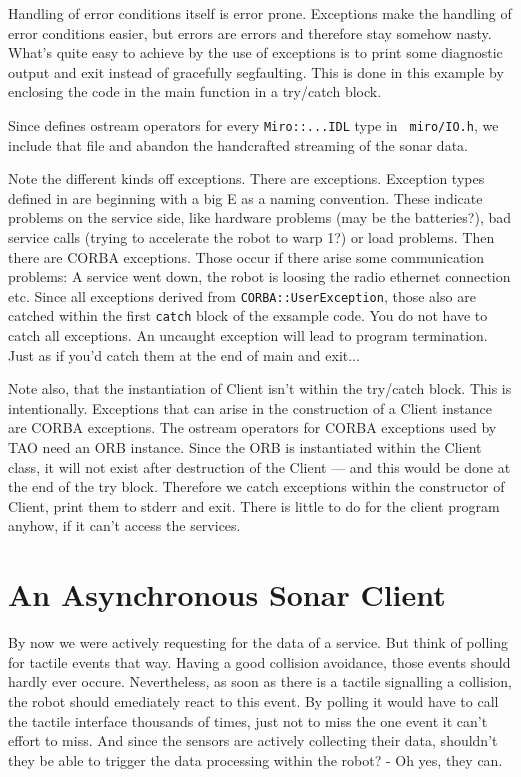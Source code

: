Handling of error conditions itself is error prone. Exceptions make
the handling of error conditions easier, but errors are errors and
therefore stay somehow nasty. What's quite easy to achieve by the use
of exceptions is to print some diagnostic output and exit instead of
gracefully segfaulting. This is done in this example by enclosing the
code in the main function in a try/catch block.

Since \miro defines ostream operators for every \lstinline!Miro::...IDL!
type in \lstinline! miro/IO.h!, we include that file and abandon the
handcrafted streaming of the sonar data.

Note the different kinds off exceptions. There are \miro exceptions.
Exception types defined in \miro are beginning with a big E as a
naming convention. These indicate problems on the service side, like
hardware problems (may be the batteries?), bad service calls (trying
to accelerate the robot to warp 1?) or load problems. Then there are
CORBA exceptions. Those occur if there arise some communication
problems: A service went down, the robot is loosing the radio ethernet
connection etc. Since all \miro
exceptions derived from \lstinline!CORBA::UserException!, those also
are catched within the first \lstinline!catch! block of the exsample
code. You do not have to catch all exceptions. An uncaught exception
will lead to program termination. Just as if you'd catch them at the
end of main and exit...

Note also, that the instantiation of Client isn't within the try/catch
block. This is intentionally. Exceptions that can arise in the
construction of a Client instance are CORBA exceptions. The ostream
operators for CORBA exceptions used by TAO need an ORB
instance. Since the ORB is instantiated within the Client class, it
will not exist after destruction of the Client --- and this would be
done at the end of the try block. Therefore we catch exceptions within
the constructor of Client, print them to stderr and exit. There is
little to do for the client program anyhow, if it can't access the
services. 


\label{lst:SonarPoll3}

\section{An Asynchronous Sonar Client}
\label{sec:notify}

By now we were actively requesting for the data of a service. But
think of polling for tactile events that way. Having a good collision
avoidance, those events should hardly ever occure. Nevertheless, as
soon as there is a tactile signalling a collision, the robot should
emediately react to this event. By polling it would have to call the
tactile interface thousands of times, just not to miss the one event
it can't effort to miss. And since the sensors are actively collecting
their data, shouldn't they be able to trigger the data processing
within the robot? - Oh yes, they can.

